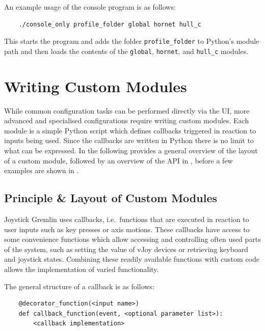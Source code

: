 \documentclass[a4, 10pt]{article}
\begin{document}
An example usage of the console program is as follows:
\begin{verbatim}
    ./console_only profile_folder global hornet hull_c
\end{verbatim}

This starts the program and adds the folder \verb+profile_folder+ to
Python's module path and then loads the contents of the \verb+global+,
\verb+hornet+, and \verb+hull_c+ modules.


\section{Writing Custom Modules}
\label{sec:custom_modules}

While common configuration tasks can be performed directly via the UI,
more advanced and specialised configurations require writing custom
modules. Each module is a simple Python script which defines callbacks
triggered in reaction to inputs being used. Since the callbacks are
written in Python there is no limit to what can be expressed. In the
following  provides a general overview of the
layout of a custom module, followed by an overview of the API in
, before a few examples are shown in
.


\subsection{Principle \& Layout of Custom Modules}
\label{sec:cm_principles}

Joystick Gremlin uses callbacks, i.e.\ functions that are executed in
reaction to user inputs such as key presses or axis motions. These
callbacks have access to some convenience functions which allow
accessing and controlling often used parts of the system, such as
setting the value of vJoy devices or retrieving keyboard and joystick
states. Combining these readily available functions with custom code
allows the implementation of varied functionality.

The general structure of a callback is as follows:
\begin{verbatim}
    @decorator_function(<input name>)
    def callback_function(event, <optional parameter list>):
        <callback implementation>
\end{verbatim}
\end{document}
